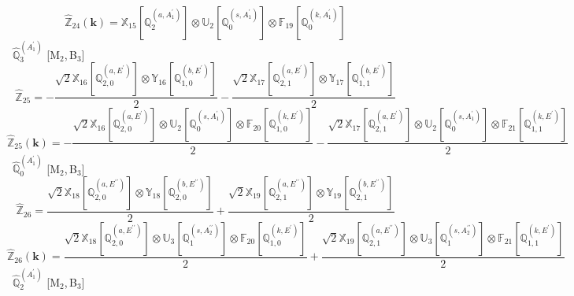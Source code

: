 \documentclass[fleqn,10pt,landscape]{article}
\begin{document}
\begin{itemize}
\begin{dmath*}
\end{dmath*}
\begin{dmath*}
\hat{\mathbb{Z}}_{24}(\bm{k})=\mathbb{X}_{15}[\mathbb{Q}_{2}^{(a,A_{1}^{\prime})}] \otimes\mathbb{U}_{2}[\mathbb{Q}_{0}^{(s,A_{1}^{\prime})}] \otimes\mathbb{F}_{19}[\mathbb{Q}_{0}^{(k,A_{1}^{\prime})}]
\end{dmath*}
\vspace{4mm}
\noindent {} $\,\,\,\hat{\mathbb{Q}}_{3}^{(A_{1}^{\prime})}$ [M$_{2}$,\,B$_{3}$]
\begin{dmath*}
\hat{\mathbb{Z}}_{25}=- \frac{\sqrt{2} \mathbb{X}_{16}[\mathbb{Q}_{2,0}^{(a,E^{\prime})}] \otimes\mathbb{Y}_{16}[\mathbb{Q}_{1,0}^{(b,E^{\prime})}]}{2} - \frac{\sqrt{2} \mathbb{X}_{17}[\mathbb{Q}_{2,1}^{(a,E^{\prime})}] \otimes\mathbb{Y}_{17}[\mathbb{Q}_{1,1}^{(b,E^{\prime})}]}{2}
\end{dmath*}
\begin{dmath*}
\hat{\mathbb{Z}}_{25}(\bm{k})=- \frac{\sqrt{2} \mathbb{X}_{16}[\mathbb{Q}_{2,0}^{(a,E^{\prime})}] \otimes\mathbb{U}_{2}[\mathbb{Q}_{0}^{(s,A_{1}^{\prime})}] \otimes\mathbb{F}_{20}[\mathbb{Q}_{1,0}^{(k,E^{\prime})}]}{2} - \frac{\sqrt{2} \mathbb{X}_{17}[\mathbb{Q}_{2,1}^{(a,E^{\prime})}] \otimes\mathbb{U}_{2}[\mathbb{Q}_{0}^{(s,A_{1}^{\prime})}] \otimes\mathbb{F}_{21}[\mathbb{Q}_{1,1}^{(k,E^{\prime})}]}{2}
\end{dmath*}
\vspace{4mm}
\noindent {} $\,\,\,\hat{\mathbb{Q}}_{0}^{(A_{1}^{\prime})}$ [M$_{2}$,\,B$_{3}$]
\begin{dmath*}
\hat{\mathbb{Z}}_{26}=\frac{\sqrt{2} \mathbb{X}_{18}[\mathbb{Q}_{2,0}^{(a,E^{\prime\prime})}] \otimes\mathbb{Y}_{18}[\mathbb{Q}_{2,0}^{(b,E^{\prime\prime})}]}{2} + \frac{\sqrt{2} \mathbb{X}_{19}[\mathbb{Q}_{2,1}^{(a,E^{\prime\prime})}] \otimes\mathbb{Y}_{19}[\mathbb{Q}_{2,1}^{(b,E^{\prime\prime})}]}{2}
\end{dmath*}
\begin{dmath*}
\hat{\mathbb{Z}}_{26}(\bm{k})=\frac{\sqrt{2} \mathbb{X}_{18}[\mathbb{Q}_{2,0}^{(a,E^{\prime\prime})}] \otimes\mathbb{U}_{3}[\mathbb{Q}_{1}^{(s,A_{2}^{\prime\prime})}] \otimes\mathbb{F}_{20}[\mathbb{Q}_{1,0}^{(k,E^{\prime})}]}{2} + \frac{\sqrt{2} \mathbb{X}_{19}[\mathbb{Q}_{2,1}^{(a,E^{\prime\prime})}] \otimes\mathbb{U}_{3}[\mathbb{Q}_{1}^{(s,A_{2}^{\prime\prime})}] \otimes\mathbb{F}_{21}[\mathbb{Q}_{1,1}^{(k,E^{\prime})}]}{2}
\end{dmath*}
\vspace{4mm}
\noindent {} $\,\,\,\hat{\mathbb{Q}}_{2}^{(A_{1}^{\prime})}$ [M$_{2}$,\,B$_{3}$]

\end{itemize}
\end{document}
